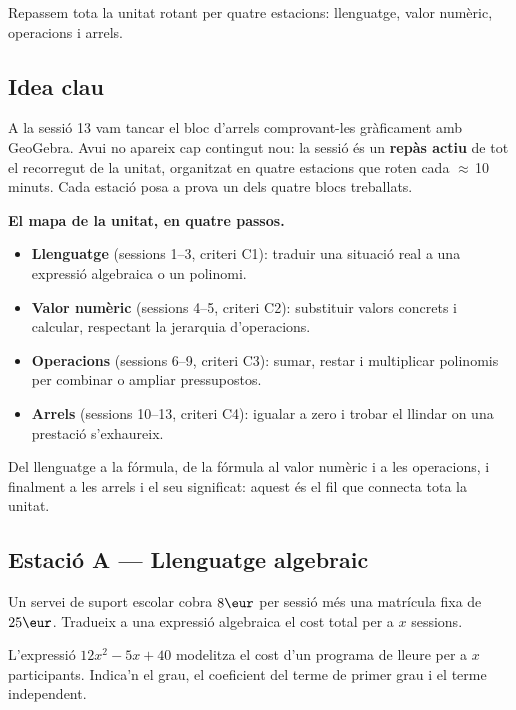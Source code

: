 %
{Repassem tota la unitat rotant per quatre estacions: llenguatge, valor numèric, operacions i arrels.}

\subsection{Idea clau}

A la sessió 13 vam tancar el bloc d'arrels comprovant-les gràficament amb
GeoGebra. Avui no apareix cap contingut nou: la sessió és un \textbf{repàs
actiu} de tot el recorregut de la unitat, organitzat en quatre estacions
que roten cada $\approx$\,10 minuts. Cada estació posa a prova un dels
quatre blocs treballats.

\begin{idea}
\textbf{El mapa de la unitat, en quatre passos.}
\begin{itemize}[leftmargin=1.4em, itemsep=2pt]
  \item \textbf{Llenguatge} (sessions 1–3, criteri C1): traduir una
        situació real a una expressió algebraica o un polinomi.
  \item \textbf{Valor numèric} (sessions 4–5, criteri C2): substituir
        valors concrets i calcular, respectant la jerarquia
        d'operacions.
  \item \textbf{Operacions} (sessions 6–9, criteri C3): sumar, restar i
        multiplicar polinomis per combinar o ampliar pressupostos.
  \item \textbf{Arrels} (sessions 10–13, criteri C4): igualar a zero i
        trobar el llindar on una prestació s'exhaureix.
\end{itemize}
Del llenguatge a la fórmula, de la fórmula al valor numèric i a les
operacions, i finalment a les arrels i el seu significat: aquest és el
fil que connecta tota la unitat.
\end{idea}

\subsection*{Estació A — Llenguatge algebraic}

\begin{exercicis}
\begin{exlist}
  \item Un servei de suport escolar cobra $8\eur$ per sessió més una
        matrícula fixa de $25\eur$. Tradueix a una expressió algebraica
        el cost total per a $x$ sessions.

  \item L'expressió $12x^2-5x+40$ modelitza el cost d'un programa de
        lleure per a $x$ participants. Indica'n el grau, el coeficient
        del terme de primer grau i el terme independent.
\end{exlist}
\end{exercicis}

